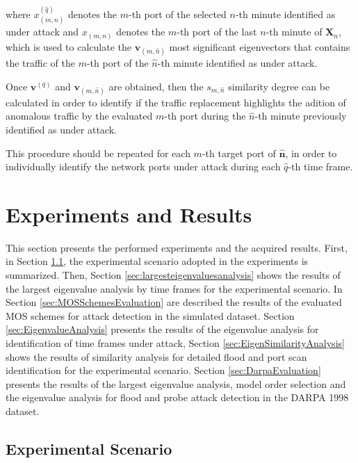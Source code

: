 \documentclass[review]{elsarticle}
\begin{document}
where $x^{(\hat{q})}_{(m,\hat{n})}$ denotes the $m$-th port of the selected $n$-th minute identified as under attack and $x_{(m,n)}$ denotes the $m$-th port of the last $n$-th minute of $\boldsymbol{X}_n$, which is used to calculate the $\boldsymbol{v}_{(m,\hat{n})}$ most significant eigenvectors that contains the traffic of the $m$-th port of the $\hat{n}$-th minute identified as under attack.

Once $\boldsymbol{v}^{(q)}$ and $\boldsymbol{v}_{(m,\hat{n})}$ are obtained, then the $s_{m,\hat{n}}$ similarity degree can be calculated in order to identify if the traffic replacement highlights the adition of anomalous traffic by the evaluated $m$-th port during the $\hat{n}$-th minute previously identified as under attack. 

This procedure should be repeated for each $m$-th target port of $\boldsymbol{\hat{n}}$, in order to individually identify the network ports under attack during each $\hat{q}$-th time frame.

\section{Experiments and Results}
\label{sec:experimentalresults}

This section presents the performed experiments and the acquired results. First, in Section \ref{sec:AnalyzedScenario}, the experimental scenario adopted in the experiments is summarized. Then, Section \ref{sec:largesteigenvaluesanalysis} shows the results of the largest eigenvalue analysis by time frames for the experimental scenario. In Section \ref{sec:MOSSchemesEvaluation} are described the results of the evaluated MOS schemes for attack detection in the simulated dataset. Section \ref{sec:EigenvalueAnalysis} presents the results of the eigenvalue analysis for identification of time frames under attack, Section \ref{sec:EigenSimilarityAnalysis} shows the results of similarity analysis for detailed flood and port scan identification for the experimental scenario. Section \ref{sec:DarpaEvaluation} presents the results of the largest eigenvalue analysis, model order selection and the eigenvalue analysis for flood and probe attack detection in the DARPA 1998 dataset.

\subsection{Experimental Scenario}
\label{sec:AnalyzedScenario}
\end{document}
